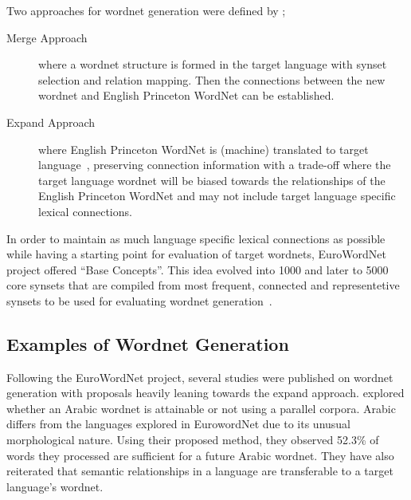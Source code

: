 Two approaches for wordnet generation were defined by ;
\begin{description}
    \item[Merge Approach] where a wordnet structure is formed in the target language with synset selection and relation mapping. Then the connections between the new wordnet and English Princeton WordNet can be established.
    \item[Expand Approach] where English Princeton WordNet is (machine) translated to target language~\cite{knight_building_1994}, preserving connection information with a trade-off where the target language wordnet will be biased towards the relationships of the English Princeton WordNet and may not include target language specific lexical connections.
\end{description}

In order to maintain as much language specific lexical connections as possible while having a starting point for evaluation of target wordnets, EuroWordNet project offered \enquote{Base Concepts}.
This idea evolved into 1000 and later to 5000 core synsets that are compiled from most frequent, connected and representetive synsets to be used for evaluating wordnet generation~\cite{boyd-graber_adding_2006}.

\subsection{Examples of Wordnet Generation}%
\label{sub:examples_of_wordnet_generation}

Following the EuroWordNet project, several studies were published on wordnet generation with proposals heavily leaning towards the expand approach.
\textcite{diab_feasibility_2004} explored whether an Arabic wordnet is attainable or not using a parallel corpora.
Arabic differs from the languages explored in EurowordNet due to its unusual morphological nature.
Using their proposed method, they observed 52.3\% of words they processed are sufficient for a future Arabic wordnet.
They have also reiterated that semantic relationships in a language are transferable to a target language's wordnet.

